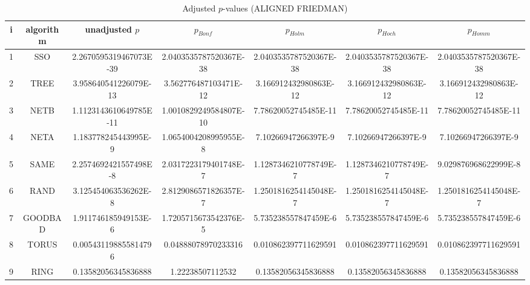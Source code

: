 \documentclass[a4paper,10pt]{article}
\begin{document}
\begin{landscape}
\begin{table}[!htp]
\centering\scriptsize
\caption{Adjusted $p$-values (ALIGNED FRIEDMAN)}
\begin{tabular}{ccccccc}
i&algorithm&unadjusted $p$&$p_{Bonf}$&$p_{Holm}$&$p_{Hoch}$&$p_{Homm}$\\
\hline
1& SSO&2.2670595319467073E-39&2.0403535787520367E-38&2.0403535787520367E-38&2.0403535787520367E-38&2.0403535787520367E-38\\
2& TREE&3.958640541226079E-13&3.562776487103471E-12&3.166912432980863E-12&3.166912432980863E-12&3.166912432980863E-12\\
3& NETB&1.1123143610649785E-11&1.0010829249584807E-10&7.78620052745485E-11&7.78620052745485E-11&7.78620052745485E-11\\
4& NETA&1.183778245443995E-9&1.0654004208995955E-8&7.10266947266397E-9&7.10266947266397E-9&7.10266947266397E-9\\
5& SAME&2.2574692421557498E-8&2.0317223179401748E-7&1.1287346210778749E-7&1.1287346210778749E-7&9.029876968622999E-8\\
6& RAND&3.125454063536262E-8&2.8129086571826357E-7&1.2501816254145048E-7&1.2501816254145048E-7&1.2501816254145048E-7\\
7& GOODBAD&1.911746185949153E-6&1.7205715673542376E-5&5.735238557847459E-6&5.735238557847459E-6&5.735238557847459E-6\\
8& TORUS&0.005431198855814796&0.04888078970233316&0.010862397711629591&0.010862397711629591&0.010862397711629591\\
9& RING&0.13582056345836888&1.22238507112532&0.13582056345836888&0.13582056345836888&0.13582056345836888\\
\hline
\end{tabular}
\end{table}


\end{landscape}
\end{document}
